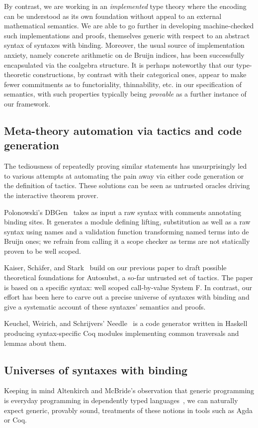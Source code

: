 By contrast, we are working in an \emph{implemented} type theory where the
encoding can be understood as its own foundation without appeal to an external
mathematical semantics. We are able to go further in developing machine-checked
such implementations and proofs, themselves generic with respect to an abstract syntax
 of syntaxes with binding. Moreover, the usual source of implementation
anxiety, namely concrete arithmetic on de Bruijn indices, has been successfully
encapsulated via the  coalgebra structure. It is perhaps noteworthy that
our type-theoretic constructions, by contrast with their categorical ones,
appear to make fewer commitments as to functoriality, thinnability, etc. in our
specification of semantics, with such properties typically being \emph{provable}
as a further instance of our framework.

\subsection{Meta-theory automation via tactics and code generation} The
tediousness of repeatedly
proving similar statements has unsurprisingly led to various attempts at
automating the pain away via either code generation or the definition of
tactics. These solutions can be seen as untrusted oracles driving the
interactive theorem prover.

Polonowski's DBGen~\citeyear{polonowski:db} takes as input a raw syntax with
comments annotating binding sites. It generates a module defining lifting,
substitution as well as a raw syntax using names and a validation function
transforming named terms into de Bruijn ones; we refrain from calling it a
scope checker as terms are not statically proven to be well scoped.

Kaiser, Schäfer, and Stark~\citeyear{Kaiser-wsdebr} build on our previous paper
to draft possible theoretical foundations for Autosubst, a so-far untrusted
set of tactics. The paper is based on a specific syntax: well scoped call-by-value
System F. In contrast, our effort has been here to carve out
a precise universe of syntaxes with binding and give a systematic account
of these syntaxes' semantics and proofs.

Keuchel, Weirich, and Schrijvers' Needle~\citeyear{needleandknot} is a code
generator written in Haskell producing syntax-specific Coq modules
implementing common traversals and lemmas about them.

\subsection{Universes of syntaxes with binding} Keeping in mind Altenkirch
and McBride's observation that generic programming is everyday programming
in dependently typed languages~\citeyear{DBLP:conf/ifip2-1/AltenkirchM02}, we can naturally
expect generic, provably sound, treatments of these notions in tools such as
Agda or Coq.

